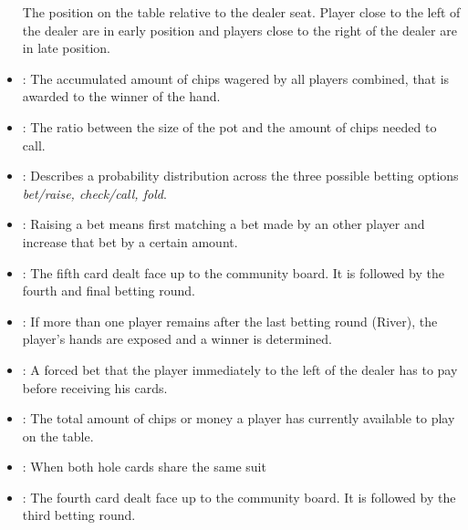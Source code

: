 \begin{appendices}
\begin{itemize}
The position on the table relative to the dealer seat. Player close to the left of the dealer are in early position and players close to the right of the dealer are in late position.
\item {}:
The accumulated amount of chips wagered by all players combined, that is awarded to the winner of the hand.
\item {}:
The ratio between the size of the pot and the amount of chips needed to call.
\item {}:
Describes a probability distribution across the three possible betting options \textit{bet/raise, check/call, fold}.
\item {}:
Raising a bet means first matching a bet made by an other player and increase that bet by a certain amount.
\item {}: The fifth card dealt face up to the community board. It is followed by the fourth and final betting round.
\item {}:
If more than one player remains after the last betting round (River), the player's hands are exposed and a winner is determined.
\item {}:
A forced bet that the player immediately to the left of the dealer has to pay before receiving his cards.
\item {}:
The total amount of chips or money a player has currently available to play on the table.
\item {}:
When both hole cards share the same suit
\item {}: The fourth card dealt face up to the community board. It  is followed by the third betting round. 
\end{itemize}
\end{appendices}



